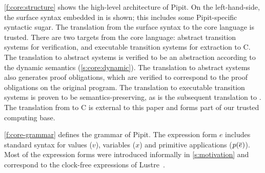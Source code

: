 \documentclass[a4paper,UKenglish,cleveref, autoref, thm-restate,anonymous]{lipics-v2021}
\begin{document}
\autoref{f:core:structure} shows the high-level architecture of Pipit.
On the left-hand-side, the surface syntax embedded in \fstar{} is shown; this includes some Pipit-specific syntactic sugar.
The translation from the surface syntax to the core language is trusted.
There are two targets from the core language: abstract transition systems for verification, and executable transition systems for extraction to C.
The translation to abstract systems is verified to be an abstraction according to the dynamic semantics (\autoref{s:core:dynamic}).
The translation to abstract systems also generates proof obligations, which are verified to correspond to the proof obligations on the original program.
The translation to executable transition systems is proven to be semantics-preserving, as is the subsequent translation to \lowstar{}.
The translation from \lowstar{} to C is external to this paper and forms part of our trusted computing base.


\autoref{f:core-grammar} defines the grammar of Pipit.
The expression form $e$ includes standard syntax for values ($v$), variables ($x$) and primitive applications ($p(\overline{e})$).
Most of the expression forms were introduced informally in \autoref{s:motivation} and correspond to the clock-free expressions of Lustre~\cite{caspi1995functional}.
\end{document}

